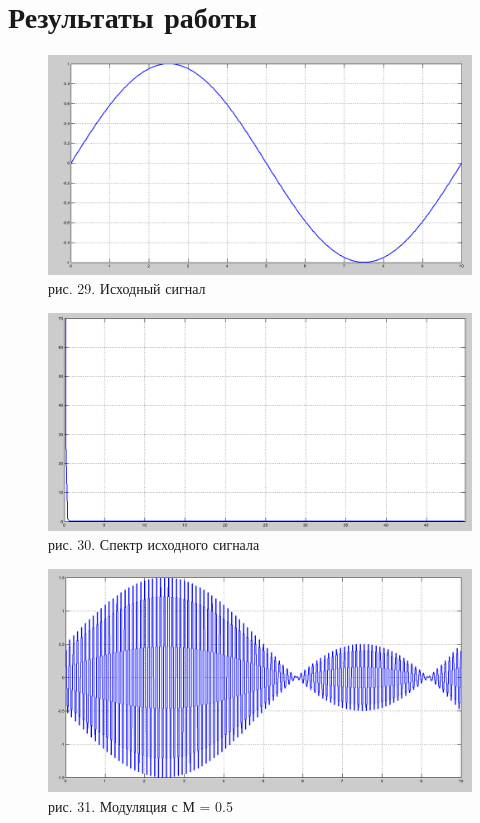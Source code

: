 \documentclass[10pt,a4paper]{report}
\begin{document}
\section{Результаты работы}
\begin{figure}
\begin{center}
\includegraphics[width=150mm, scale = 0.9]{7_1.png}\newline
рис. 29. Исходный сигнал\newline
\end{center}
\end{figure}
\begin{figure}
\begin{center}
\includegraphics[width=150mm, scale = 0.9]{7_2.png}\newline
рис. 30. Спектр исходного сигнала\newline
\end{center}
\end{figure}
\begin{figure}
\begin{center}
\includegraphics[width=150mm, scale = 0.9]{7_3.png}\newline
рис. 31. Модуляция с М = 0.5\newline
\end{center}
\end{figure}
\end{document}
